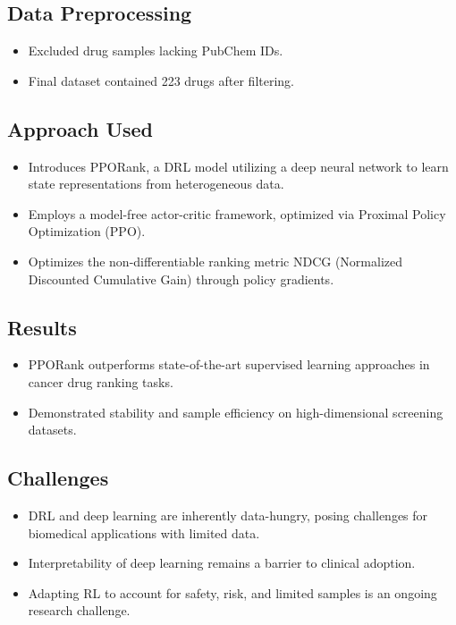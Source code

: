 \subsection*{Data Preprocessing}
\begin{itemize}
    \item Excluded drug samples lacking PubChem IDs.
    \item Final dataset contained 223 drugs after filtering.
\end{itemize}

\subsection*{Approach Used}
\begin{itemize}
    \item Introduces PPORank, a DRL model utilizing a deep neural network to learn state representations from heterogeneous data.
    \item Employs a model-free actor-critic framework, optimized via Proximal Policy Optimization (PPO).
    \item Optimizes the non-differentiable ranking metric NDCG (Normalized Discounted Cumulative Gain) through policy gradients.
\end{itemize}

\subsection*{Results}
\begin{itemize}
    \item PPORank outperforms state-of-the-art supervised learning approaches in cancer drug ranking tasks.
    \item Demonstrated stability and sample efficiency on high-dimensional screening datasets.
\end{itemize}

\subsection*{Challenges}
\begin{itemize}
    \item DRL and deep learning are inherently data-hungry, posing challenges for biomedical applications with limited data.
    \item Interpretability of deep learning remains a barrier to clinical adoption.
    \item Adapting RL to account for safety, risk, and limited samples is an ongoing research challenge.
\end{itemize}

